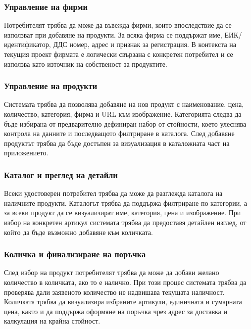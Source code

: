 \subsubsection{Управление на фирми}

Потребителят трябва да може да въвежда фирми, които впоследствие да се използват при добавяне на продукти. За всяка фирма се поддържат име, ЕИК/идентификатор, ДДС номер, адрес и признак за регистрация. В контекста на текущия проект фирмата е логически свързана с конкретен потребител и се използва като източник на собственост за продуктите.

\subsubsection{Управление на продукти}

Системата трябва да позволява добавяне на нов продукт с наименование, цена, количество, категория, фирма и URL към изображение. Категорията следва да бъде избирана от предварително дефиниран набор от стойности, което улеснява контрола на данните и последващото филтриране в каталога. След добавяне продуктът трябва да бъде достъпен за визуализация в каталожната част на приложението.

\subsubsection{Каталог и преглед на детайли}

Всеки удостоверен потребител трябва да може да разглежда каталога на наличните продукти. Каталогът трябва да поддържа филтриране по категории, а за всеки продукт да се визуализират име, категория, цена и изображение. При избор на конкретен артикул системата трябва да предоставя детайлен изглед, от който да бъде възможно добавяне към количката.

\subsubsection{Количка и финализиране на поръчка}

След избор на продукт потребителят трябва да може да добави желано количество в количката, ако то е налично. При този процес системата трябва да проверява дали заявеното количество не надвишава текущата наличност. Количката трябва да визуализира избраните артикули, единичната и сумарната цена, както и да поддържа оформяне на поръчка чрез адрес за доставка и калкулация на крайна стойност.

